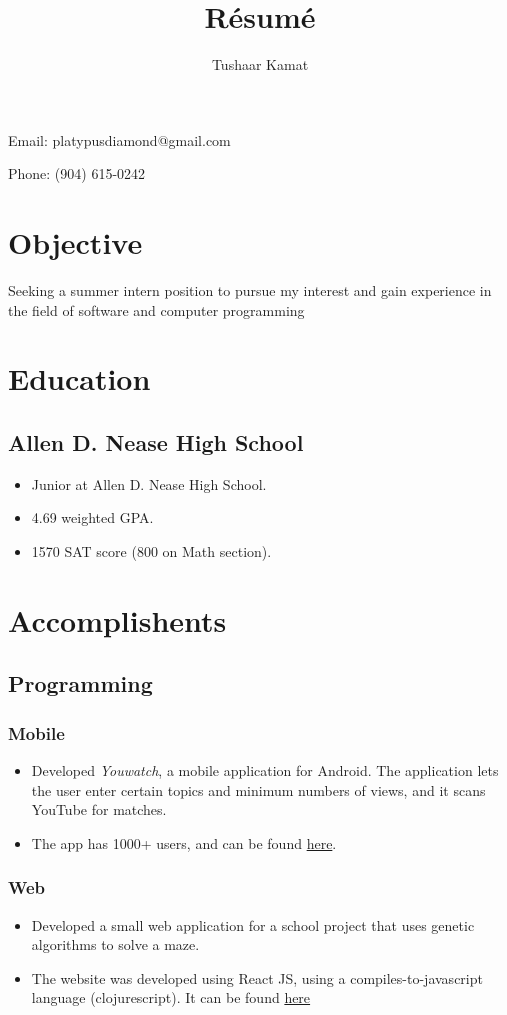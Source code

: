 \documentclass[12pt]{article}
\author{Tushaar Kamat}
\title{R\'esum\'e}
\makeatletter
\renewcommand{\maketitle}{
  \begin{center}
  \begin{huge}
    \theauthor
  \end{huge}

  Email: platypusdiamond@gmail.com

  Phone: (904) 615-0242
  \end{center}
}
\makeatother
\begin{document}
\maketitle

\section{Objective}
Seeking a summer intern position to pursue my interest and gain experience in
the field of software and computer programming

\section{Education} 
\subsection{Allen D. Nease High School}
\begin{itemize}
\item Junior at Allen D. Nease High School.
\item 4.69 weighted GPA. 
\item 1570 SAT score (800 on Math section).
\end{itemize}

\section{Accomplishents}
\subsection{Programming}
\subsubsection{Mobile}
\begin{itemize}
\item Developed \textit{Youwatch}, a mobile application for Android. The
  application lets the user enter certain topics and minimum numbers of views,
  and it scans YouTube for matches.
\item The app has 1000+ users, and can be found
  \href{https://play.google.com/store/apps/details?id=com.tkamat.android.youwatch\&hl=en}{here}.
\end{itemize}

\subsubsection{Web}
\begin{itemize}
\item Developed a small web application for a school project that uses genetic
  algorithms to solve a maze.  
\item The website was developed using React JS, using a compiles-to-javascript
  language (clojurescript). It can be found
  \href{https://tkamat.github.io/maze-evolution/}{here}
\end{itemize}
\end{document}
